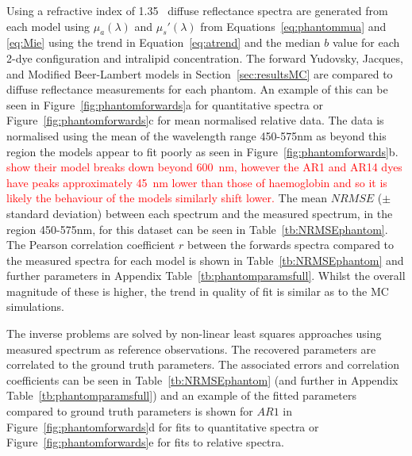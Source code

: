 Using a refractive index of 1.35~\citep{Pogue2006} diffuse reflectance spectra are generated from each model using $\mu_a(\lambda)$ and $\mu_s'(\lambda)$ from Equations~\eqref{eq:phantommua} and \eqref{eq:Mie} using the trend in Equation~\eqref{eq:atrend} and the median $b$ value for each 2-dye configuration and intralipid concentration. The forward Yudovsky, Jacques, and Modified Beer-Lambert models in Section~\ref{sec:resultsMC} are compared to diffuse reflectance measurements for each phantom.
An example of this can be seen in Figure~\ref{fig:phantomforwards}a for quantitative spectra or Figure~\ref{fig:phantomforwards}c for mean normalised relative data.
The data is normalised using the mean of the wavelength range 450-575nm as beyond this region the models appear to fit poorly as seen in Figure~\ref{fig:phantomforwards}b. \textcolor{red}{\citet{Yudovsky2011a} show their model breaks down beyond 600~nm, however the AR1 and AR14 dyes have peaks approximately 45~nm lower than those of haemoglobin and so it is likely the behaviour of the models similarly shift lower.}
The mean $NRMSE$ ($\pm$ standard deviation) between each spectrum and the measured spectrum, in the region 450-575nm, for this dataset can be seen in Table~\ref{tb:NRMSEphantom}. 
The Pearson correlation coefficient $r$ between the forwards spectra compared to the measured spectra for each model is shown in Table~\ref{tb:NRMSEphantom} and further parameters in Appendix Table~\ref{tb:phantomparamsfull}. Whilst the overall magnitude of these is higher, the trend in quality of fit is similar as to the MC simulations. 

The inverse problems are solved by non-linear least squares  approaches using measured spectrum as reference observations. The recovered parameters are correlated to the ground truth parameters. The associated errors and correlation coefficients can be seen in Table~\ref{tb:NRMSEphantom} (and further in Appendix Table~\ref{tb:phantomparamsfull}) and an example of the fitted parameters compared to ground truth parameters is shown for $AR1$ in Figure~\ref{fig:phantomforwards}d for fits to quantitative spectra or Figure~\ref{fig:phantomforwards}e for fits to 
relative spectra.

